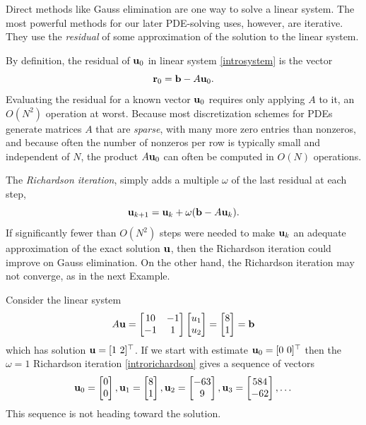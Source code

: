 Direct methods like Gauss elimination \citep{TrefethenBau1997} are one way to solve a linear system.  The most powerful methods for our later PDE-solving uses, however, are iterative.  They use the \emph{residual} of some approximation of the solution to the linear system.

By definition, the residual of $\mathbf{u}_0$ in linear system \eqref{introsystem} is the vector
\begin{equation}
\mathbf{r}_0 = \mathbf{b} - A \mathbf{u}_0. \label{residualdefn}
\end{equation}
Evaluating the residual for a known vector $\mathbf{u}_0$ requires only applying $A$ to it, an $O(N^2)$ operation at worst.  Because most discretization schemes for PDEs generate matrices $A$ that are \emph{sparse}, with many more zero entries than nonzeros, and because often the number of nonzeros per row is typically small and independent of $N$, the product $A\mathbf{u}_0$ can often be computed in $O(N)$ operations.

The \emph{Richardson iteration}, simply adds a multiple $\omega$ of the last residual at each step,
\begin{equation}
\mathbf{u}_{k+1} = \mathbf{u}_k + \omega (\mathbf{b} - A \mathbf{u}_k).  \label{introrichardson}
\end{equation}
If significantly fewer than $O(N^2)$ steps were needed to make $\mathbf{u}_k$ an adequate approximation of the exact solution $\mathbf{u}$, then the Richardson iteration could improve on Gauss elimination.  On the other hand, the Richardson iteration may not converge, as in the next Example.

\medskip\noindent\hrulefill
\begin{example} Consider the linear system
\begin{equation}
A \mathbf{u}
= \begin{bmatrix}
10 & -1 \\ -1 & 1
\end{bmatrix}
\begin{bmatrix} u_1 \\ u_2 \end{bmatrix}
= \begin{bmatrix} 8 \\ 1 \end{bmatrix}
= \mathbf{b}
 \label{introexample}
\end{equation}
which has solution $\mathbf{u} = [1\,\, 2]^\top$.  If we start with estimate $\mathbf{u}_0 = [0\,\, 0]^\top$ then the $\omega=1$ Richardson iteration \eqref{introrichardson} gives a sequence of vectors %
\begin{equation}
{\mathbf{u}}_{0} = \begin{bmatrix} 0 \\ 0 \end{bmatrix}, {\mathbf{u}}_{1} = \begin{bmatrix} 8 \\ 1 \end{bmatrix}, {\mathbf{u}}_{2} = \begin{bmatrix} -63 \\ 9 \end{bmatrix}, {\mathbf{u}}_{3} = \begin{bmatrix} 584 \\ -62 \end{bmatrix}, \dots
\end{equation}
This sequence is not heading toward the solution.
\end{example}
\noindent\hrulefill

